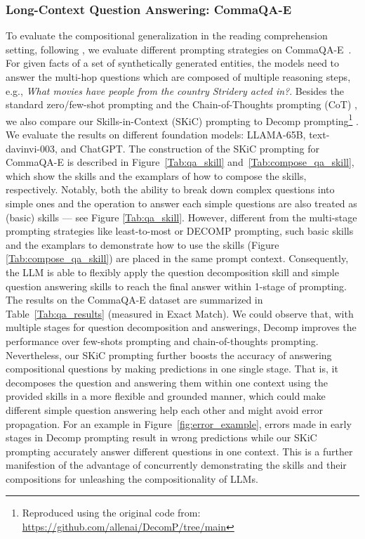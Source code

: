 \subsubsection{Long-Context Question Answering: CommaQA-E}  
To evaluate the compositional generalization in the reading comprehension setting, following \citeauthor{khot2022decomposed}, we evaluate different prompting strategies on CommaQA-E~\citep{khot2021hey}. For given facts of a set of synthetically generated entities, the models need to answer the multi-hop questions which are composed of multiple reasoning steps, e.g., \textit{What movies have people from the country Stridery acted in?}. Besides the standard zero/few-shot prompting \citep{brown2020language} and the Chain-of-Thoughts prompting (CoT) \citep{wei2022chain}, we also compare our Skills-in-Context (SKiC) prompting to Decomp prompting\footnote{Reproduced using the original code from: \url{https://github.com/allenai/DecomP/tree/main}} \citep{khot2022decomposed}. We evaluate the results on different foundation models: LLAMA-65B, text-davinvi-003, and ChatGPT. The construction of the SKiC prompting for CommaQA-E is described in Figure~\ref{Tab:qa_skill} and~\ref{Tab:compose_qa_skill}, which show the skills and the examplars of how to compose the skills, respectively. Notably, both the ability to break down complex questions into simple ones and the operation to answer each simple questions are also treated as (basic) skills --- see Figure \ref{Tab:qa_skill}. However, different from the multi-stage prompting strategies like least-to-most or DECOMP prompting, such basic skills and the examplars to demonstrate how to use the skills (Figure \ref{Tab:compose_qa_skill}) are placed in the same prompt context. Consequently, the LLM is able to flexibly apply the question decomposition skill and simple question answering skills to reach the final answer within 1-stage of prompting. The results on the CommaQA-E dataset are summarized in Table~\ref{Tab:qa_results} (measured in Exact Match). We could observe that, with multiple stages for question decomposition and answerings, Decomp improves the performance over few-shots prompting and chain-of-thoughts prompting. Nevertheless, our SKiC prompting further boosts the accuracy of answering compositional questions by making predictions in one single stage. That is, it decomposes the question and answering them within one context using the provided skills in a more flexible and grounded manner, which could make different simple question answering help each other and might avoid error propagation. For an example in Figure~\ref{fig:error_example}, errors made in early stages in Decomp prompting result in wrong predictions while our SKiC prompting accurately answer different questions in one context. This is a further manifestion of the advantage of concurrently demonstrating the skills and their compositions for unleashing the compositionality of LLMs. 




